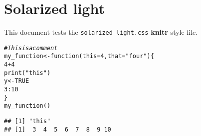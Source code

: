 \documentclass{article}\usepackage[]{graphicx}\usepackage[]{color}
\makeatletter
\newcommand{\hlnum}[1]{\textcolor[rgb]{0.827,0.212,0.51}{#1}}%
\newcommand{\hlstr}[1]{\textcolor[rgb]{0.165,0.631,0.596}{#1}}%
\newcommand{\hlcom}[1]{\textcolor[rgb]{0.576,0.631,0.631}{\textit{#1}}}%
\newcommand{\hlopt}[1]{\textcolor[rgb]{0.522,0.6,0}{#1}}%
\newcommand{\hlstd}[1]{\textcolor[rgb]{0.396,0.482,0.514}{#1}}%
\newcommand{\hlkwa}[1]{\textcolor[rgb]{0.71,0.537,0}{#1}}%
\newcommand{\hlkwb}[1]{\textcolor[rgb]{0.522,0.6,0}{#1}}%
\newcommand{\hlkwc}[1]{\textcolor[rgb]{0.396,0.482,0.514}{#1}}%
\newcommand{\hlkwd}[1]{\textcolor[rgb]{0.149,0.545,0.824}{#1}}%
\newenvironment{kframe}{%
 \def\at@end@of@kframe{}%
 \ifinner\ifhmode%
  \def\at@end@of@kframe{\end{minipage}}%
  \begin{minipage}{\columnwidth}%
 \fi\fi%
 \def\FrameCommand##1{\hskip\@totalleftmargin \hskip-\fboxsep
 \colorbox{shadecolor}{##1}\hskip-\fboxsep
     \hskip-\linewidth \hskip-\@totalleftmargin \hskip\columnwidth}%
 \MakeFramed {\advance\hsize-\width
   \@totalleftmargin\z@ \linewidth\hsize
   \@setminipage}}%
 {\par\unskip\endMakeFramed%
 \at@end@of@kframe}
\newenvironment{knitrout}{}{} %
\makeatother
\begin{document}
\section{Solarized light}

This document tests the \texttt{solarized-light.css} \textbf{knitr} style file.

\begin{knitrout}
\color{fgcolor}\begin{kframe}
\begin{alltt}
\hlcom{# This is a comment}
\hlstd{my_function} \hlkwb{<-} \hlkwa{function}\hlstd{(}\hlkwc{this} \hlstd{=} \hlnum{4}\hlstd{,} \hlkwc{that} \hlstd{=} \hlstr{"four"}\hlstd{) \{}
    \hlnum{4} \hlopt{+} \hlnum{4}
    \hlkwd{print}\hlstd{(}\hlstr{"this"}\hlstd{)}
    \hlstd{y} \hlkwb{<-} \hlnum{TRUE}
    \hlnum{3}\hlopt{:}\hlnum{10}
\hlstd{\}}
\hlkwd{my_function}\hlstd{()}
\end{alltt}
\begin{verbatim}
## [1] "this"
## [1]  3  4  5  6  7  8  9 10
\end{verbatim}
\end{kframe}
\end{knitrout}
\end{document}
